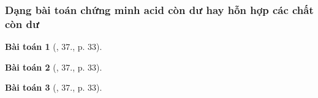 \documentclass{article}
\newtheorem{baitoan}{Bài toán}
\begin{document}
\subsubsection{Dạng bài toán chứng minh acid còn dư hay hỗn hợp các chất còn dư}

\begin{baitoan}[\cite{An_350_BT_Hoa_Hoc_9}, 37., p. 33]
	
\end{baitoan}

\begin{baitoan}[\cite{An_350_BT_Hoa_Hoc_9}, 37., p. 33]
	
\end{baitoan}

\begin{baitoan}[\cite{An_350_BT_Hoa_Hoc_9}, 37., p. 33]
	
\end{baitoan}



\printbibliography[heading=bibintoc]
	
\end{document}
